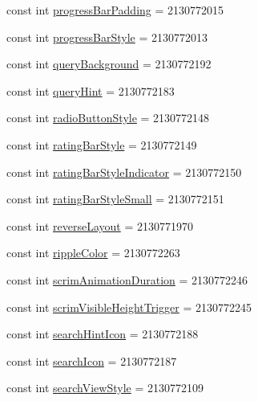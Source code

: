 \begin{CompactItemize}
\item 
const int \hyperlink{class__2doo_1_1_droid_1_1_resource_1_1_attribute_8d84c3cbabd1db5626a964f4a7b51ddb}{progressBarPadding} = 2130772015
\item 
const int \hyperlink{class__2doo_1_1_droid_1_1_resource_1_1_attribute_0d072cbf0996afb4f1de77dfdb72e69c}{progressBarStyle} = 2130772013
\item 
const int \hyperlink{class__2doo_1_1_droid_1_1_resource_1_1_attribute_bc5b06e4d0a81f1565f16d94cb4b4a38}{queryBackground} = 2130772192
\item 
const int \hyperlink{class__2doo_1_1_droid_1_1_resource_1_1_attribute_3145cf26af6d4a64307f2687b270d4d8}{queryHint} = 2130772183
\item 
const int \hyperlink{class__2doo_1_1_droid_1_1_resource_1_1_attribute_0272fed8cb11ae2d9642c730bf56b602}{radioButtonStyle} = 2130772148
\item 
const int \hyperlink{class__2doo_1_1_droid_1_1_resource_1_1_attribute_0e5a1138e4a76e14f7dd2e7aadfba87e}{ratingBarStyle} = 2130772149
\item 
const int \hyperlink{class__2doo_1_1_droid_1_1_resource_1_1_attribute_b03105095dd0fcee9bf3e451ca610351}{ratingBarStyleIndicator} = 2130772150
\item 
const int \hyperlink{class__2doo_1_1_droid_1_1_resource_1_1_attribute_e7d7954fa11be0448f793183432e08e6}{ratingBarStyleSmall} = 2130772151
\item 
const int \hyperlink{class__2doo_1_1_droid_1_1_resource_1_1_attribute_de701e5773d7121cd7ede8215f79bc74}{reverseLayout} = 2130771970
\item 
const int \hyperlink{class__2doo_1_1_droid_1_1_resource_1_1_attribute_3c7088adde59d92399d0f6e9c7de0f21}{rippleColor} = 2130772263
\item 
const int \hyperlink{class__2doo_1_1_droid_1_1_resource_1_1_attribute_00df4d133376ff533dd08043678bf6db}{scrimAnimationDuration} = 2130772246
\item 
const int \hyperlink{class__2doo_1_1_droid_1_1_resource_1_1_attribute_a0114b7027534a2f9602da192abb0bbc}{scrimVisibleHeightTrigger} = 2130772245
\item 
const int \hyperlink{class__2doo_1_1_droid_1_1_resource_1_1_attribute_eee57e30310f3d96009c85715381cc19}{searchHintIcon} = 2130772188
\item 
const int \hyperlink{class__2doo_1_1_droid_1_1_resource_1_1_attribute_c61d33f574c639770f092a652c85c803}{searchIcon} = 2130772187
\item 
const int \hyperlink{class__2doo_1_1_droid_1_1_resource_1_1_attribute_9a5b41fa756e5cd61aba0c0c545432d7}{searchViewStyle} = 2130772109

\end{CompactItemize}
